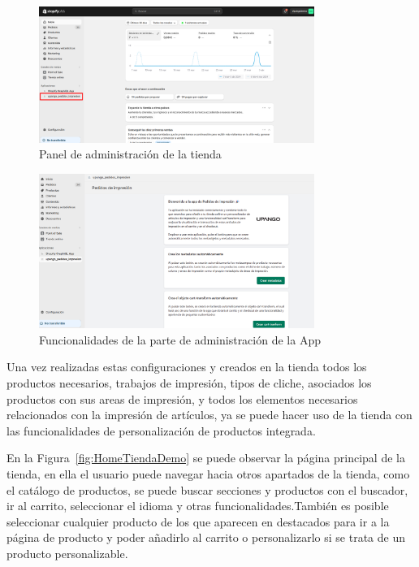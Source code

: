 \documentclass[12pt]{article}
\begin{document}
\begin{figure}[ht]
    \centering
    \includegraphics[width=0.8\textwidth]{imagenes/ManualUsuario/PaginaAdministracion.png}
    \caption{\label{fig:PanelAdministracion}Panel de administración de la tienda}
    \vspace{\fill}
\end{figure}

\begin{figure}[ht]
    \centering
    \includegraphics[width=0.8\textwidth]{imagenes/ManualUsuario/FuncionalidadPaginaAdministracion.png}
    \caption{\label{fig:FuncionalidadAdministracion}Funcionalidades de la parte de administración de la App}
    \vspace{\fill}
\end{figure}

Una vez realizadas estas configuraciones y creados en la tienda todos los productos necesarios, trabajos de impresión, tipos de cliche, asociados los productos con sus areas de impresión, y todos los elementos necesarios relacionados con
la impresión de artículos, ya se puede hacer uso de la tienda con las funcionalidades de personalización de productos integrada.

En la Figura~\ref{fig:HomeTiendaDemo} se puede observar la página principal de la tienda, en ella el usuario puede navegar hacia otros apartados de la tienda, como el catálogo de productos, se puede buscar secciones y productos con el buscador, ir al carrito, seleccionar el idioma y otras funcionalidades.También
es posible seleccionar cualquier producto de los que aparecen en destacados para ir a la página de producto y poder añadirlo al carrito o personalizarlo si se trata de un producto
personalizable.
\end{document}
